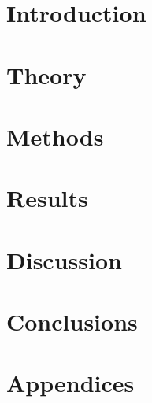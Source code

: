 \documentclass[a4paper, 12pt, openany]{book} %
\begin{document}

\chapter{Introduction}

\cleardoublepage


\chapter{Theory}

\cleardoublepage


\chapter{Methods}

\cleardoublepage


\chapter{Results}

\cleardoublepage


\chapter{Discussion}

\cleardoublepage


\chapter{Conclusions}

\cleardoublepage


\printbibliography[title={References}] %
\cleardoublepage


\chapter*{\LARGE \textbf{Appendices}}
\fancyhf{} %
\renewcommand{\headrulewidth}{0pt} %
\fancyfoot[C]{\thepage} %

\appendix

\end{document}
